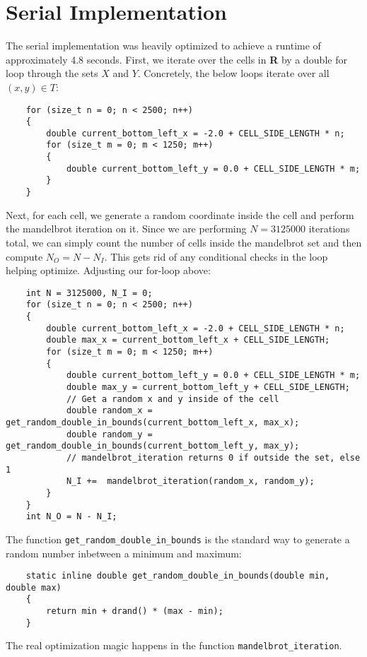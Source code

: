 \documentclass{article}
\begin{document}
\section{Serial Implementation}

The serial implementation was heavily optimized to achieve a runtime of approximately 
4.8 seconds. First, we iterate over the cells in \textbf{R} by a double for loop 
through the sets $X$ and $Y$. Concretely, the below loops iterate over all $(x, y) \in T$:
\begin{lstlisting}
    for (size_t n = 0; n < 2500; n++)
    {
        double current_bottom_left_x = -2.0 + CELL_SIDE_LENGTH * n;
        for (size_t m = 0; m < 1250; m++)
        {
            double current_bottom_left_y = 0.0 + CELL_SIDE_LENGTH * m;
        }
    }
\end{lstlisting}
Next, for each cell, we generate a random coordinate inside the cell and perform the 
mandelbrot iteration on it. Since we are performing $N = 3125000$ iterations total, we 
can simply count the number of cells inside the mandelbrot set and then compute $N_O = N - N_I$. 
This gets rid of any conditional checks in the loop helping optimize.
Adjusting our for-loop above:
\begin{lstlisting}
    int N = 3125000, N_I = 0;
    for (size_t n = 0; n < 2500; n++)
    {
        double current_bottom_left_x = -2.0 + CELL_SIDE_LENGTH * n;
        double max_x = current_bottom_left_x + CELL_SIDE_LENGTH;
        for (size_t m = 0; m < 1250; m++)
        {
            double current_bottom_left_y = 0.0 + CELL_SIDE_LENGTH * m;
            double max_y = current_bottom_left_y + CELL_SIDE_LENGTH;
            // Get a random x and y inside of the cell
            double random_x = get_random_double_in_bounds(current_bottom_left_x, max_x);
            double random_y = get_random_double_in_bounds(current_bottom_left_y, max_y);
            // mandelbrot_iteration returns 0 if outside the set, else 1
            N_I +=  mandelbrot_iteration(random_x, random_y);
        }
    }
    int N_O = N - N_I; 
\end{lstlisting}
The function \texttt{get\_random\_double\_in\_bounds} is the standard way to generate 
a random number inbetween a minimum and maximum:
\newpage
\begin{lstlisting}
    static inline double get_random_double_in_bounds(double min, double max)
    {
        return min + drand() * (max - min);
    }   
\end{lstlisting}
The real optimization magic happens in the function \texttt{mandelbrot\_iteration}. 
\end{document}
